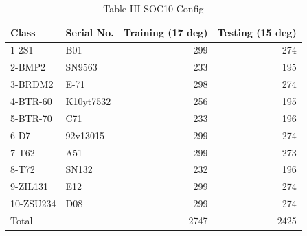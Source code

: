 \begin{table}
\caption{Table III SOC10 Config}
\begin{tabular}{llrr}
\toprule
Class & Serial No. & Training (17 deg) & Testing (15 deg) \\
\midrule
1-2S1 & B01 & 299 & 274 \\
2-BMP2 & SN9563 & 233 & 195 \\
3-BRDM2 & E-71 & 298 & 274 \\
4-BTR-60 & K10yt7532 & 256 & 195 \\
5-BTR-70 & C71 & 233 & 196 \\
6-D7 & 92v13015 & 299 & 274 \\
7-T62 & A51 & 299 & 273 \\
8-T72 & SN132 & 232 & 196 \\
9-ZIL131 & E12 & 299 & 274 \\
10-ZSU234 & D08 & 299 & 274 \\
Total & - & 2747 & 2425 \\
\bottomrule
\end{tabular}
\end{table}
